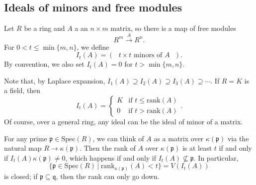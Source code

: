 \documentclass{amsart}[12pt]
\newcommand{\Spec}{\mathrm{Spec}}
\newcommand{\fp}{{\mathfrak p}}
\newcommand{\fq}{{\mathfrak q}}
\numberwithin{equation}{section}
\theoremstyle{plain} %
\theoremstyle{definition}
\theoremstyle{remark}
\newcommand{\xra}[1]{\xrightarrow{#1}}
\begin{document}
\subsection{Ideals of minors and free modules}

Let $R$ be a ring and $A$ a an $n\times m$ matrix, so there is a map of free modules
\[ R^m \xra{A} R^n.\]
For $0<t\leq \min\{m,n\}$, we define
\[ I_t(A) = ( \text{ $t\times t$ minors of $A$ } ).\]
By convention, we also set $I_t(A)=0$ for $t> \min\{m,n\}$.

Note that, by Laplace expansion, $I_1(A) \supseteq I_2(A) \supseteq I_3(A) \supseteq \cdots$.
If $R=K$ is a field, then
\[ I_t(A) = \begin{cases} K & \text{if $t\leq \mathrm{rank}(A)$}\\ 0 & \text{if $t> \mathrm{rank}(A)$}\end{cases}.\]
Of course, over a general ring, any ideal can be the ideal of minor of a matrix.

For any prime $\fp\in \Spec(R)$, we can think of $A$ as a matrix over $\kappa(\fp)$ via the natural map $R\to \kappa(\fp)$. Then the rank of $A$ over $\kappa(\fp)$ is at least $t$ if and only if $I_t(A)\kappa(\fp) \neq 0$, which happens if and only if $I_t(A) \not\subseteq \fp$. In particular, 
\[ \{ \fp \in \Spec(R) \ | \ \mathrm{rank}_{\kappa(\fp)}(A) < t\} = V(I_t(A))\]
is closed; if $\fp\subseteq \fq$, then the rank can only go down.
\end{document}
